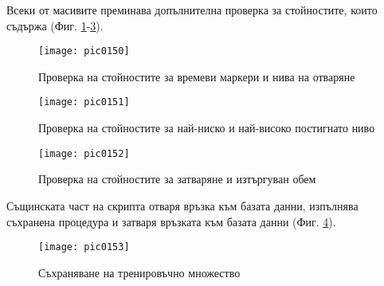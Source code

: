 Всеки от масивите преминава допълнителна проверка за стойностите, които съдържа (Фиг. \ref{fig:pic0150}-\ref{fig:pic0152}).

\begin{figure}[h]
  \centering
  \texttt{[image: pic0150]}
  \caption{Проверка на стойностите за времеви маркери и нива на отваряне}
\label{fig:pic0150}
\end{figure}
\FloatBarrier

\begin{figure}[h]
  \centering
  \texttt{[image: pic0151]}
  \caption{Проверка на стойностите за най-ниско и най-високо постигнато ниво}
\label{fig:pic0151}
\end{figure}
\FloatBarrier

\begin{figure}[h]
  \centering
  \texttt{[image: pic0152]}
  \caption{Проверка на стойностите за затваряне и изтъргуван обем}
\label{fig:pic0152}
\end{figure}
\FloatBarrier

Същинската част на скрипта отваря връзка към базата данни, изпълнява съхранена процедура и затваря връзката към базата данни (Фиг. \ref{fig:pic0153}).

\begin{figure}[h]
  \centering
  \texttt{[image: pic0153]}
  \caption{Съхраняване на тренировъчно множество}
\label{fig:pic0153}
\end{figure}
\FloatBarrier